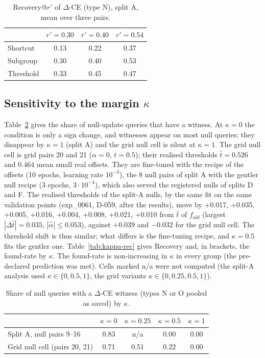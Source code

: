 \documentclass[10pt,a4paper]{article}
\theoremstyle{remark}
\newcommand{\DCE}{$\Delta$-CE}
\begin{document}
\begin{table}[h]
\caption{Recovery@$r'$ of \DCE{} (type N), split A, mean over three pairs.}\label{tab:rprime}
\centering\small
\begin{tabular}{lccc}
\toprule
 & $r'=0.30$ & $r'=0.40$ & $r'=0.54$\\
\midrule
Shortcut & 0.13 & 0.22 & 0.37 \\
Subgroup & 0.30 & 0.40 & 0.53 \\
Threshold & 0.33 & 0.45 & 0.47 \\
\bottomrule
\end{tabular}
\end{table}

\subsection{Sensitivity to the margin $\kappa$}

Table~\ref{tab:kappa-null} gives the share of null-update queries that have a witness. At $\kappa=0$ the condition is only a sign change, and witnesses appear on most null queries; they disappear by $\kappa=1$ (split A) and the grid null cell is silent at $\kappa=1$. The grid null cell is grid pairs 20 and 21 ($\alpha=0$, $t=0.5$); their realised thresholds $\hat t=0.526$ and $0.464$ mean small real offsets. They are fine-tuned with the recipe of the offsets (10 epochs, learning rate $10^{-3}$), the 8 null pairs of split A with the gentler null recipe (3 epochs, $3\cdot10^{-4}$), which also served the registered nulls of splits D and F. The realised thresholds of the split-A nulls, by the same fit on the same validation points (exp\_0061, D-059, after the results), move by +0.017, +0.035, +0.005, +0.016, +0.004, +0.008, +0.021, +0.010 from $\hat t$ of $f_{old}$ (largest $|\Delta\hat t|=0.035$, $|\hat\alpha|\le0.053$), against $+0.039$ and $-0.032$ for the grid null cell. The threshold shift is thus similar; what differs is the fine-tuning recipe, and $\kappa=0.5$ fits the gentler one. Table~\ref{tab:kappa-rec} gives Recovery and, in brackets, the found-rate by $\kappa$. The found-rate is non-increasing in $\kappa$ in every group (the pre-declared prediction was met). Cells marked n/a were not computed (the split-A analysis used $\kappa\in\{0,0.5,1\}$, the grid variants $\kappa\in\{0,0.25,0.5,1\}$).

\begin{table}[h]
\caption{Share of null queries with a \DCE{} witness (types N or O pooled as saved) by $\kappa$.}\label{tab:kappa-null}
\centering\small
\begin{tabular}{lcccc}
\toprule
 & $\kappa=0$ & $\kappa=0.25$ & $\kappa=0.5$ & $\kappa=1$\\
\midrule
Split A, null pairs 9--16 & 0.83 & n/a & 0.00 & 0.00 \\
Grid null cell (pairs 20, 21) & 0.71 & 0.51 & 0.22 & 0.00 \\
\bottomrule
\end{tabular}
\end{table}
\end{document}
